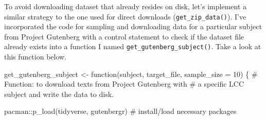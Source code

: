 \documentclass[
  letterpaper,
]{latex/krantz}
\newenvironment{Shaded}{\begin{snugshade}}{\end{snugshade}}
\newcommand{\AttributeTok}[1]{\textcolor[rgb]{0.40,0.45,0.13}{#1}}
\newcommand{\CommentTok}[1]{\textcolor[rgb]{0.37,0.37,0.37}{#1}}
\newcommand{\ControlFlowTok}[1]{\textcolor[rgb]{0.00,0.23,0.31}{#1}}
\newcommand{\DecValTok}[1]{\textcolor[rgb]{0.68,0.00,0.00}{#1}}
\newcommand{\FunctionTok}[1]{\textcolor[rgb]{0.28,0.35,0.67}{#1}}
\newcommand{\NormalTok}[1]{\textcolor[rgb]{0.00,0.23,0.31}{#1}}
\newcommand{\OtherTok}[1]{\textcolor[rgb]{0.00,0.23,0.31}{#1}}
\newcommand{\SpecialCharTok}[1]{\textcolor[rgb]{0.37,0.37,0.37}{#1}}
\begin{document}
To avoid downloading dataset that already resides on disk, let's
implement a similar strategy to the one used for direct downloads
(\texttt{get\_zip\_data()}). I've incorporated the code for sampling and
downloading data for a particular subject from Project Gutenberg with a
control statement to check if the dataset file already exists into a
function I named \texttt{get\_gutenberg\_subject()}. Take a look at this
function below.

\begin{Shaded}
\begin{Highlighting}[]
\NormalTok{get\_gutenberg\_subject }\OtherTok{\textless{}{-}} \ControlFlowTok{function}\NormalTok{(subject, target\_file, }\AttributeTok{sample\_size =} \DecValTok{10}\NormalTok{) \{}
  \CommentTok{\# Function: to download texts from Project Gutenberg with }
  \CommentTok{\# a specific LCC subject and write the data to disk.}
  
\NormalTok{  pacman}\SpecialCharTok{::}\FunctionTok{p\_load}\NormalTok{(tidyverse, gutenbergr) }\CommentTok{\# install/load necessary packages}
  

\end{Highlighting}
\end{Shaded}
\end{document}
